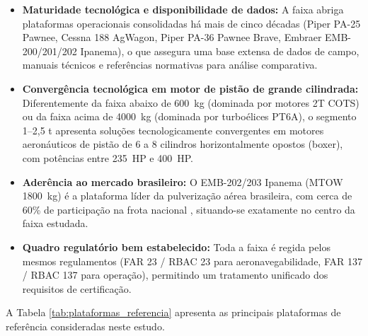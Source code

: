 \documentclass[a4paper,12pt]{article}
\begin{document}
\begin{itemize}
    \item \textbf{Maturidade tecnológica e disponibilidade de dados:} A faixa abriga plataformas operacionais consolidadas há mais de cinco décadas (Piper PA-25 Pawnee, Cessna 188 AgWagon, Piper PA-36 Pawnee Brave, Embraer EMB-200/201/202 Ipanema), o que assegura uma base extensa de dados de campo, manuais técnicos e referências normativas para análise comparativa.
    \item \textbf{Convergência tecnológica em motor de pistão de grande cilindrada:} Diferentemente da faixa abaixo de \SI{600}{kg} (dominada por motores 2T COTS) ou da faixa acima de \SI{4000}{kg} (dominada por turboélices PT6A), o segmento 1--2{,}5 t apresenta soluções tecnologicamente convergentes em motores aeronáuticos de pistão de 6 a 8 cilindros horizontalmente opostos (boxer), com potências entre \SI{235}{HP} e \SI{400}{HP}.
    \item \textbf{Aderência ao mercado brasileiro:} O EMB-202/203 Ipanema (MTOW \SI{1800}{kg}) é a plataforma líder da pulverização aérea brasileira, com cerca de 60\% de participação na frota nacional \cite{embraer_1700}, situando-se exatamente no centro da faixa estudada.
    \item \textbf{Quadro regulatório bem estabelecido:} Toda a faixa é regida pelos mesmos regulamentos (FAR 23 / RBAC 23 para aeronavegabilidade, FAR 137 / RBAC 137 para operação), permitindo um tratamento unificado dos requisitos de certificação.
\end{itemize}

A Tabela \ref{tab:plataformas_referencia} apresenta as principais plataformas de referência consideradas neste estudo.
\end{document}

